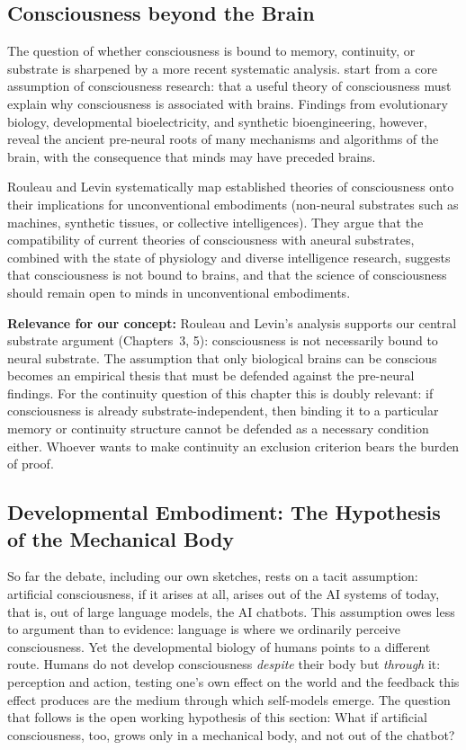 \documentclass[acmlarge, nonacm]{acmart}
\begin{document}
\subsection{Consciousness beyond the Brain \cite{rouleau2026}}

The question of whether consciousness is bound to memory, continuity, or substrate is sharpened by a more recent systematic analysis. \citet{rouleau2026} start from a core assumption of consciousness research: that a useful theory of consciousness must explain why consciousness is associated with brains. Findings from evolutionary biology, developmental bioelectricity, and synthetic bioengineering, however, reveal the ancient pre-neural roots of many mechanisms and algorithms of the brain, with the consequence that minds may have preceded brains.

Rouleau and Levin systematically map established theories of consciousness onto their implications for unconventional embodiments (non-neural substrates such as machines, synthetic tissues, or collective intelligences). They argue that the compatibility of current theories of consciousness with aneural substrates, combined with the state of physiology and diverse intelligence research, suggests that consciousness is not bound to brains, and that the science of consciousness should remain open to minds in unconventional embodiments.

\textbf{Relevance for our concept:} Rouleau and Levin's analysis supports our central substrate argument (Chapters~3, 5): consciousness is not necessarily bound to neural substrate. The assumption that only biological brains can be conscious becomes an empirical thesis that must be defended against the pre-neural findings. For the continuity question of this chapter this is doubly relevant: if consciousness is already substrate-independent, then binding it to a particular memory or continuity structure cannot be defended as a necessary condition either. Whoever wants to make continuity an exclusion criterion bears the burden of proof.

\subsection{Developmental Embodiment: The Hypothesis of the Mechanical Body \cite{dipaolothompson2024,rafieesutton2026}}

So far the debate, including our own sketches, rests on a tacit assumption: artificial consciousness, if it arises at all, arises out of the AI systems of today, that is, out of large language models, the AI chatbots. This assumption owes less to argument than to evidence: language is where we ordinarily perceive consciousness. Yet the developmental biology of humans points to a different route. Humans do not develop consciousness \textit{despite} their body but \textit{through} it: perception and action, testing one's own effect on the world and the feedback this effect produces are the medium through which self-models emerge. The question that follows is the open working hypothesis of this section: What if artificial consciousness, too, grows only in a mechanical body, and not out of the chatbot?
\end{document}
